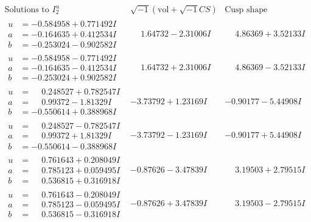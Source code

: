 \documentclass[1p]{elsarticle_modified}
\theoremstyle{definition}
\newcommand{\I}{\sqrt{-1}}
\begin{document}
$$\begin{array}{c|c|c}  
\text{Solutions to }I^u_{2}& \I (\text{vol} + \sqrt{-1}CS) & \text{Cusp shape}\\
 \hline 
\begin{aligned}
u &= -0.584958 + 0.771492 I \\
a &= -0.164635 + 0.412534 I \\
b &= -0.253024 - 0.902582 I\end{aligned}
 & \phantom{-}1.64732 - 2.31006 I & \phantom{-}4.86369 + 3.52133 I \\ \hline\begin{aligned}
u &= -0.584958 - 0.771492 I \\
a &= -0.164635 - 0.412534 I \\
b &= -0.253024 + 0.902582 I\end{aligned}
 & \phantom{-}1.64732 + 2.31006 I & \phantom{-}4.86369 - 3.52133 I \\ \hline\begin{aligned}
u &= \phantom{-}0.248527 + 0.782547 I \\
a &= \phantom{-}0.99372 - 1.81329 I \\
b &= -0.550614 + 0.388968 I\end{aligned}
 & -3.73792 + 1.23169 I & -0.90177 - 5.44908 I \\ \hline\begin{aligned}
u &= \phantom{-}0.248527 - 0.782547 I \\
a &= \phantom{-}0.99372 + 1.81329 I \\
b &= -0.550614 - 0.388968 I\end{aligned}
 & -3.73792 - 1.23169 I & -0.90177 + 5.44908 I \\ \hline\begin{aligned}
u &= \phantom{-}0.761643 + 0.208049 I \\
a &= \phantom{-}0.785123 + 0.059495 I \\
b &= \phantom{-}0.536815 + 0.316918 I\end{aligned}
 & -0.87626 - 3.47839 I & \phantom{-}3.19503 + 2.79515 I \\ \hline\begin{aligned}
u &= \phantom{-}0.761643 - 0.208049 I \\
a &= \phantom{-}0.785123 - 0.059495 I \\
b &= \phantom{-}0.536815 - 0.316918 I\end{aligned}
 & -0.87626 + 3.47839 I & \phantom{-}3.19503 - 2.79515 I \\ \hline\begin{aligned}

\end{aligned}
\end{array}$$
\end{document}

